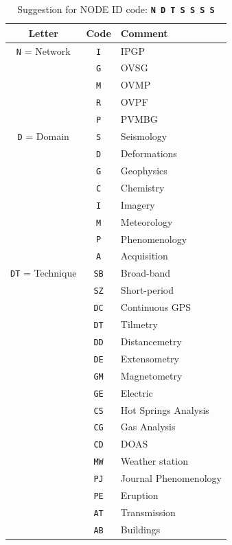 
\begin{table}
\caption{Suggestion for NODE ID code: \texttt{\textbf{N D T S S S S}}}
\label{nodeidcodes}
\begin{center}
\begin{tabular}{|c|c|l|}
\hline
\textbf{Letter} & \textbf{Code} & \textbf{Comment}\\
\hline
\texttt{N} = Network         & \texttt{I}	&	IPGP\\
      			             & \texttt{G}	&	OVSG\\
      			             & \texttt{M}	&	OVMP\\
      			             & \texttt{R}	&	OVPF\\
      			             & \texttt{P}	&	PVMBG\\
\hline
\texttt{D} = Domain          & \texttt{S}	&	Seismology\\
      			             & \texttt{D}	&	Deformations\\
      			             & \texttt{G}	&	Geophysics\\
      			             & \texttt{C}	&	Chemistry\\
      			             & \texttt{I}	&	Imagery\\
      			             & \texttt{M}	&	Meteorology\\
      			             & \texttt{P}	&	Phenomenology\\
      			             & \texttt{A}	&	Acquisition\\
\hline
\texttt{DT} = Technique      & \texttt{SB}	&	Broad-band\\
      			             & \texttt{SZ}	&	Short-period\\
      			             & \texttt{DC}	&	Continuous GPS\\
      			             & \texttt{DT}	&	Tilmetry\\
      			             & \texttt{DD}	&	Distancemetry\\
      			             & \texttt{DE}	&	Extensometry\\
      			             & \texttt{GM}	&	Magnetometry\\
      			             & \texttt{GE}	&	Electric\\
      			             & \texttt{CS}	&	Hot Springs Analysis\\
      			             & \texttt{CG}	&	Gas Analysis\\
      			             & \texttt{CD}	&	DOAS\\
      			             & \texttt{MW}	&	Weather station\\
      			             & \texttt{PJ}	&	Journal Phenomenology\\
      			             & \texttt{PE}	&	Eruption\\
      			             & \texttt{AT}	&	Transmission\\
      			             & \texttt{AB}	&	Buildings\\
\hline
\end{tabular}
\end{center}
\end{table}


